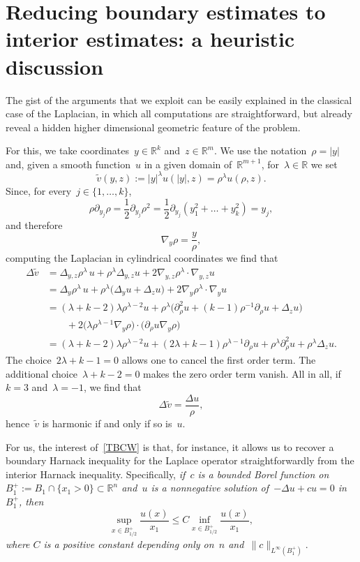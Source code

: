 \documentclass[a4paper,12pt,reqno]{amsart}
\numberwithin{equation}{section}
\theoremstyle{definition}
\theoremstyle{notation}
\newcommand{\R}{\mathds{R}}
\renewcommand{\le}{\leqslant}
\begin{document}
\section{Reducing boundary estimates to interior estimates: a heuristic discussion}\label{SE:2}


The gist of the arguments that we exploit can be easily explained in the classical case of the Laplacian, in which all computations are straightforward, but already reveal a hidden higher dimensional geometric feature of the problem.


For this, we take coordinates~$y\in\R^k$ and~$z\in\R^{m}$. We use the notation~$\rho=|y|$ and, given a smooth function~$u$ in a given domain of~$\R^{m+1}$, for~$\lambda\in\R$ we set
$$ \tilde v(y,z):=|y|^\lambda u(|y|,z)=\rho^\lambda u(\rho,z).$$
Since, for every~$j\in\{1,\dots,k\}$,
$$ \rho\partial_{y_j} \rho=\frac12\partial_{y_j} \rho^2=\frac12\partial_{y_j}(y_1^2+\dots+y_k^2)=y_j,$$
and therefore
$$ \nabla_{y} \rho=\frac{y}\rho,$$
computing the Laplacian in cylindrical coordinates we find that
\begin{align*}
\Delta\tilde v&=\Delta_{y,z}\rho^\lambda \,u+\rho^\lambda \Delta_{y,z}u +2\nabla_{y,z} \rho^\lambda \cdot\nabla_{y,z} u\\&=
\Delta_y \rho^\lambda\, u+\rho^\lambda \big(\Delta_y u+\Delta_z u\big)+2\nabla_y \rho^\lambda\cdot\nabla_y u\\&=
(\lambda+k-2)\lambda\rho^{\lambda-2}u
+\rho^\lambda \big(\partial^2_\rho u+(k-1)\rho^{-1}\partial_\rho u+\Delta_zu\big)\\&\qquad+2\big(\lambda \rho^{\lambda-1}\nabla_y\rho\big)\cdot\big(\partial_\rho u\nabla_y\rho \big)
\\&=(\lambda+k-2)\lambda\rho^{\lambda-2}u+(2\lambda+k-1) \rho^{\lambda-1}\partial_\rho u+\rho^\lambda \partial^2_\rho u+\rho^\lambda \Delta_zu.
\end{align*}
The choice~$2\lambda+k-1=0$ allows one to cancel the first order term.
The additional choice~$\lambda+k-2=0$ makes the zero order term vanish. All in all, if~$k=3$ and~$\lambda=-1$, we find that
\begin{equation}\label{TBCW} \Delta\tilde v=\frac{\Delta u}\rho,\end{equation}
hence~$\tilde v$ is harmonic if and only if so is~$u$.


For us, the interest of~\eqref{TBCW} is that, for instance, it allows us to recover a boundary Harnack inequality for the Laplace
operator straightforwardly from the interior Harnack inequality.
Specifically, {\em if~$c$ is a bounded Borel function on $B_1^+:=B_1\cap\{x_1>0\}\subset\R^n$
and~$u$ is a nonnegative solution of~$-\Delta u + c u = 0$ in~$B_1^+$, then
\begin{equation}
\label{PRE:eq:odd:harnack}
 \sup_{x \in B_{1/2}^+} \frac{u(x)}{x_1} \le C \inf_{x \in B_{1/2}^+} \frac{u(x)}{x_1} ,
\end{equation}
where $C$ is a positive constant depending only on~$n$ and~$\|c\|_{L^\infty(B_1^+)}$}.
\end{document}
